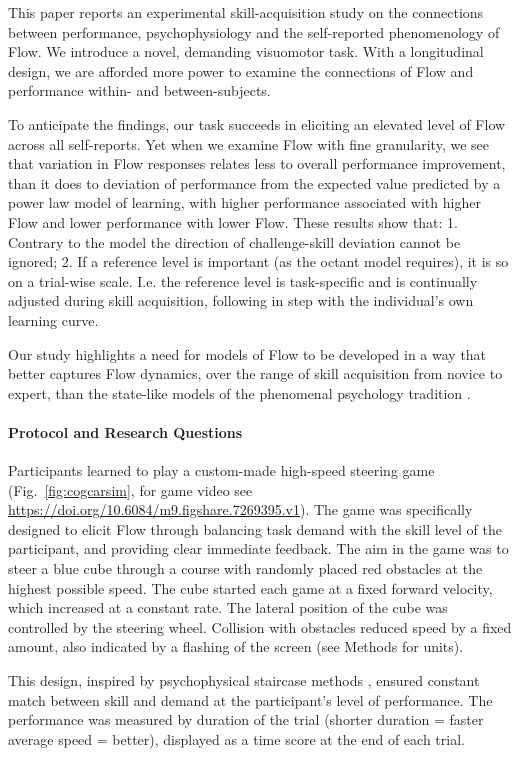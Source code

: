 \documentclass[a4paper,doc,floatsintext,natbib,10pt]{apa6}
\begin{document}
This paper reports an experimental skill-acquisition study on the connections between performance, psychophysiology and the self-reported phenomenology of Flow. We introduce a novel, demanding visuomotor task. With a longitudinal design, we are afforded more power to examine the connections of Flow and performance within- and between-subjects.

To anticipate the findings, our task succeeds in eliciting an elevated level of Flow across all self-reports. Yet when we examine Flow with fine granularity, we see that variation in Flow responses relates less to overall performance improvement, than it does to deviation of performance from the expected value predicted by a power law model of learning, with higher performance associated with higher Flow and lower performance with lower Flow. These results show that: 1. Contrary to the \cite{Keller2012} model the direction of challenge-skill deviation cannot be ignored; 2. If a reference level is important (as the octant model requires), it is so on a trial-wise scale. I.e. the reference level is task-specific and is continually adjusted during skill acquisition, following in step with the individual's own learning curve.

Our study highlights a need for models of Flow to be developed in a way that better captures Flow dynamics, over the range of skill acquisition from novice to expert, than the state-like models of the phenomenal psychology tradition \citep{Moneta2012}.

\paragraph{Protocol and Research Questions}

Participants learned to play a custom-made high-speed steering game (Fig.~\ref{fig:cogcarsim}, for game video see \url{https://doi.org/10.6084/m9.figshare.7269395.v1}). The game was specifically designed to elicit Flow through balancing task demand with the skill level of the participant, and providing clear immediate feedback. The aim in the game was to steer a blue cube through a course with randomly placed red obstacles at the highest possible speed. The cube started each game at a fixed forward velocity, which increased at a constant rate. The lateral position of the cube was controlled by the steering wheel. Collision with obstacles reduced speed by a fixed amount, also indicated by a flashing of the screen (see Methods for units).

This design, inspired by psychophysical staircase methods \citep{Cornsweet1962}, ensured constant match between skill and demand at the participant's level of performance. The performance was measured by duration of the trial (shorter duration = faster average speed = better), displayed as a time score at the end of each trial.
\end{document}
